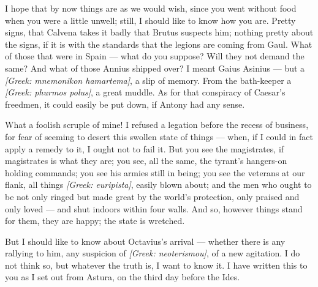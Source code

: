 

 I hope that by now things are as we would wish, since you went without food when you were a little unwell; still, I should like to know how you are. Pretty signs, that Calvena takes it badly that Brutus suspects him; nothing pretty about the signs, if it is with the standards that the legions are coming from Gaul. What of those that were in Spain --- what do you suppose? Will they not demand the same? And what of those Annius shipped over? I meant Gaius Asinius --- but a \textit{[Greek: mnemonikon hamartema]}, a slip of memory. From the bath-keeper a \textit{[Greek: phurmos polus]}, a great muddle. As for that conspiracy of Caesar's freedmen, it could easily be put down, if Antony had any sense.

 What a foolish scruple of mine! I refused a legation before the recess of business, for fear of seeming to desert this swollen state of things --- when, if I could in fact apply a remedy to it, I ought not to fail it. But you see the magistrates, if magistrates is what they are; you see, all the same, the tyrant's hangers-on holding commands; you see his armies still in being; you see the veterans at our flank, all things \textit{[Greek: euripista]}, easily blown about; and the men who ought to be not only ringed but made great by the world's protection, only praised and only loved --- and shut indoors within four walls. And so, however things stand for them, they are happy; the state is wretched.

 But I should like to know about Octavius's arrival --- whether there is any rallying to him, any suspicion of \textit{[Greek: neoterismou]}, of a new agitation. I do not think so, but whatever the truth is, I want to know it. I have written this to you as I set out from Astura, on the third day before the Ides.
